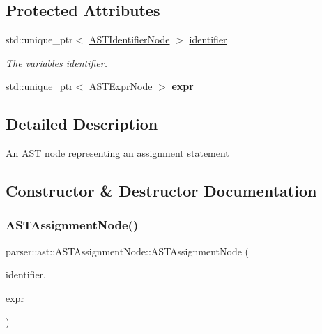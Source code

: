 \subsection*{Protected Attributes}
\begin{DoxyCompactItemize}
\item 
\mbox{\label{classparser_1_1ast_1_1ASTAssignmentNode_adc2b80713ab5ad6a0fa5f173473e505d}} 
std\+::unique\+\_\+ptr$<$ \hyperlink{classparser_1_1ast_1_1ASTIdentifierNode}{A\+S\+T\+Identifier\+Node} $>$ \hyperlink{classparser_1_1ast_1_1ASTAssignmentNode_adc2b80713ab5ad6a0fa5f173473e505d}{identifier}
\begin{DoxyCompactList}\small\item\em The variable\textquotesingle{}s identifier. \end{DoxyCompactList}\item 
\mbox{\label{classparser_1_1ast_1_1ASTAssignmentNode_aaf39398fa144912e4be67549d61cff20}} 
std\+::unique\+\_\+ptr$<$ \hyperlink{classparser_1_1ast_1_1ASTExprNode}{A\+S\+T\+Expr\+Node} $>$ {\bfseries expr}
\end{DoxyCompactItemize}


\subsection{Detailed Description}
An A\+ST node representing an assignment statement 

\subsection{Constructor \& Destructor Documentation}
\mbox{\label{classparser_1_1ast_1_1ASTAssignmentNode_aa187a542a462035acd30b07555e2c9f8}} 
\subsubsection{\texorpdfstring{A\+S\+T\+Assignment\+Node()}{ASTAssignmentNode()}}
{\footnotesize\ttfamily parser\+::ast\+::\+A\+S\+T\+Assignment\+Node\+::\+A\+S\+T\+Assignment\+Node (\begin{DoxyParamCaption}\item[{std\+::unique\+\_\+ptr$<$ \hyperlink{classparser_1_1ast_1_1ASTIdentifierNode}{parser\+::ast\+::\+A\+S\+T\+Identifier\+Node} $>$}]{identifier,  }\item[{std\+::unique\+\_\+ptr$<$ \hyperlink{classparser_1_1ast_1_1ASTExprNode}{A\+S\+T\+Expr\+Node} $>$}]{expr }\end{DoxyParamCaption})}

